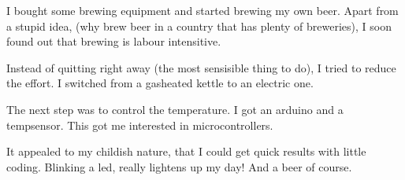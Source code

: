 \documentclass[letterpaper,10pt,english]{sphinxmanual}
\begin{document}
I bought some brewing equipment and started brewing my own beer.
Apart from a stupid idea, (why brew beer in a country that has plenty of breweries), I soon found out that brewing is labour intensitive.

Instead of quitting right away (the most sensisible thing to do), I tried to reduce the effort.
I switched from a gasheated kettle to an electric one.

The next step was to control the temperature.
I got an arduino and a temp\sphinxhyphen{}sensor.
This got me interested in microcontrollers.

It appealed to my childish nature, that I could get quick results with little coding.
Blinking a led, really lightens up my day!
And a beer of course.

\begin{sphinxVerbatim}[commandchars=\\\{\}]
              
\end{sphinxVerbatim}



\renewcommand{\indexname}{Index}
\printindex
\end{document}
